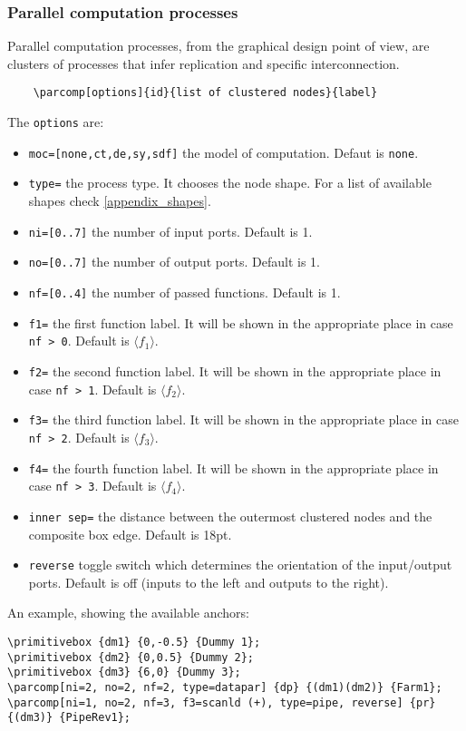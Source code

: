 \documentclass[10pt]{article}
\begin{document}
\subsubsection{Parallel computation processes}

Parallel computation processes, from the graphical design point of view, are clusters of processes that infer replication and specific interconnection.

\begin{verbatim}
	\parcomp[options]{id}{list of clustered nodes}{label}
\end{verbatim}

The \texttt{options} are:
\begin{itemize}
\item \texttt{moc=[none,ct,de,sy,sdf]} the model of computation. Defaut is \texttt{none}.
\item \texttt{type=} the process type. It chooses the node shape. For a list of available shapes check \autoref{appendix_shapes}.
\item \texttt{ni=[0..7]} the number of input ports. Default is 1.
\item \texttt{no=[0..7]} the number of output ports. Default is 1.
\item \texttt{nf=[0..4]} the number of passed functions. Default is 1.
\item \texttt{f1=} the first function label. It will be shown in the appropriate place in case \texttt{nf > 0}. Default is $\langle f_1 \rangle$.
\item \texttt{f2=} the second function label. It will be shown in the appropriate place in case \texttt{nf > 1}. Default is $\langle f_2 \rangle$.
\item \texttt{f3=} the third function label. It will be shown in the appropriate place in case \texttt{nf > 2}. Default is $\langle f_3 \rangle$.
\item \texttt{f4=} the fourth function label. It will be shown in the appropriate place in case \texttt{nf > 3}. Default is $\langle f_4 \rangle$.
\item\texttt{inner sep=} the distance between the outermost clustered nodes and the composite box edge. Default is 18pt.
\item\texttt{reverse} toggle switch which determines the orientation of the input/output ports. Default is off (inputs to the left and outputs to the right).
\end{itemize}

An example, showing the available anchors:
\begin{verbatim}
\primitivebox {dm1} {0,-0.5} {Dummy 1};
\primitivebox {dm2} {0,0.5} {Dummy 2};
\primitivebox {dm3} {6,0} {Dummy 3};
\parcomp[ni=2, no=2, nf=2, type=datapar] {dp} {(dm1)(dm2)} {Farm1};
\parcomp[ni=1, no=2, nf=3, f3=scanld (+), type=pipe, reverse] {pr} {(dm3)} {PipeRev1};
\end{verbatim}
\end{document}

